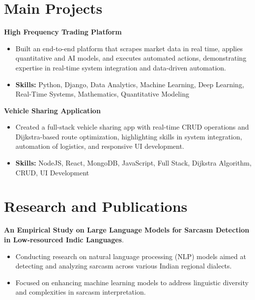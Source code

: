 \documentclass[a4paper,11pt]{article}
\begin{document}
\section{\textbf{Main Projects}}

\vspace{1mm}
  \textbf{High Frequency Trading Platform  }
\vspace{-1.5mm} %
\begin{itemize}
  \item Built an end-to-end platform that scrapes market data in real time, applies quantitative and AI models, and executes automated actions, demonstrating expertise in real-time system integration and data-driven automation.
\vspace{-3mm}
  \item \textbf{Skills:} Python, Django, Data Analytics, Machine Learning, Deep Learning, Real-Time Systems, Mathematics, Quantitative Modeling
\end{itemize}


\vspace{1mm}
   \textbf{Vehicle Sharing Application }
\vspace{-1.5mm} %
\begin{itemize}
  \item Created a full-stack vehicle sharing app with real-time CRUD operations and Dijkstra-based route optimization, highlighting skills in system integration, automation of logistics, and responsive UI development.
\vspace{-3mm}
  \item \textbf{Skills:} NodeJS, React, MongoDB, JavaScript, Full Stack, Dijkstra Algorithm, CRUD, UI Development
\end{itemize}



\section{\textbf{Research and Publications} \hfill }
\vspace{1mm}
  \textbf{An Empirical Study on Large Language Models for Sarcasm Detection in Low-resourced Indic Languages}.
\vspace{-1mm} %
\begin{itemize}
  \item Conducting research on natural language processing (NLP) models aimed at detecting and analyzing sarcasm across various Indian regional dialects.
\vspace{-3mm}
  \item Focused on enhancing machine learning models to address linguistic diversity and complexities in sarcasm interpretation.
\end{itemize}
\end{document}
